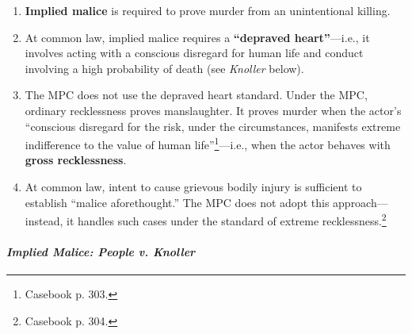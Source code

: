 \begin{enumerate}
    \item \textbf{Implied malice} is required to prove murder from an unintentional killing.
    \item At common law, implied malice requires a \textbf{``depraved heart''}---i.e., it involves acting with a conscious disregard for human life and conduct involving a high probability of death (see \emph{Knoller} below).
    \item The MPC does not use the depraved heart standard. Under the MPC, ordinary recklessness proves manslaughter. It proves murder when the actor's ``conscious disregard for the risk, under the circumstances, manifests extreme indifference to the value of human life''\footnote{Casebook p. 303.}---i.e., when the actor behaves with \textbf{gross recklessness}.
    \item At common law, intent to cause grievous bodily injury is sufficient to establish ``malice aforethought.'' The MPC does not adopt this approach---instead, it handles such cases under the standard of extreme recklessness.\footnote{Casebook p. 304.}
\end{enumerate}

\paragraph{\emph{Implied Malice: People v. Knoller}}

